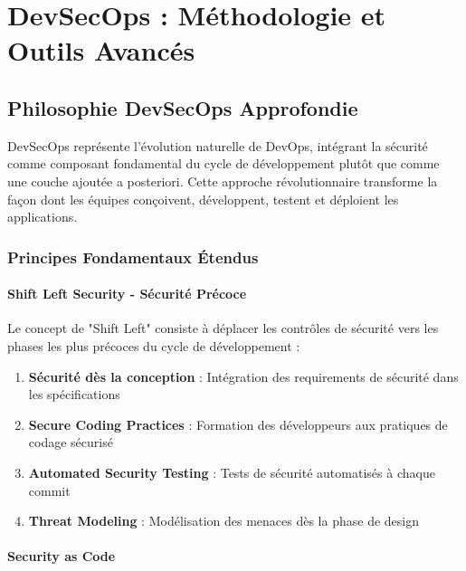 \documentclass[12pt,a4paper]{report}
\begin{document}
\chapter{DevSecOps : Méthodologie et Outils Avancés}

\section{Philosophie DevSecOps Approfondie}

DevSecOps représente l'évolution naturelle de DevOps, intégrant la sécurité comme composant fondamental du cycle de développement plutôt que comme une couche ajoutée a posteriori. Cette approche révolutionnaire transforme la façon dont les équipes conçoivent, développent, testent et déploient les applications.

\subsection{Principes Fondamentaux Étendus}

\subsubsection{Shift Left Security - Sécurité Précoce}

Le concept de "Shift Left" consiste à déplacer les contrôles de sécurité vers les phases les plus précoces du cycle de développement :

\begin{enumerate}
    \item \textbf{Sécurité dès la conception} : Intégration des requirements de sécurité dans les spécifications
    \item \textbf{Secure Coding Practices} : Formation des développeurs aux pratiques de codage sécurisé
    \item \textbf{Automated Security Testing} : Tests de sécurité automatisés à chaque commit
    \item \textbf{Threat Modeling} : Modélisation des menaces dès la phase de design
\end{enumerate}

\subsubsection{Security as Code}
\end{document}
